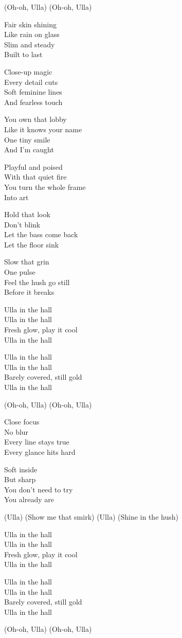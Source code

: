 \begin{lyrics}
(Oh-oh, Ulla)
(Oh-oh, Ulla)

Fair skin shining\\
Like rain on glass\\
Slim and steady\\
Built to last

Close-up magic\\
Every detail cuts\\
Soft feminine lines\\
And fearless touch

You own that lobby\\
Like it knows your name\\
One tiny smile\\
And I’m caught

Playful and poised\\
With that quiet fire\\
You turn the whole frame\\
Into art

Hold that look\\
Don’t blink\\
Let the bass come back\\
Let the floor sink

Slow that grin\\
One pulse\\
Feel the hush go still\\
Before it breaks

Ulla in the hall\\
Ulla in the hall\\
Fresh glow, play it cool\\
Ulla in the hall

Ulla in the hall\\
Ulla in the hall\\
Barely covered, still gold\\
Ulla in the hall

(Oh-oh, Ulla)
(Oh-oh, Ulla)

Close focus\\
No blur\\
Every line stays true\\
Every glance hits hard

Soft inside\\
But sharp\\
You don’t need to try\\
You already are

(Ulla)
(Show me that smirk)
(Ulla)
(Shine in the hush)

Ulla in the hall\\
Ulla in the hall\\
Fresh glow, play it cool\\
Ulla in the hall

Ulla in the hall\\
Ulla in the hall\\
Barely covered, still gold\\
Ulla in the hall

(Oh-oh, Ulla)
(Oh-oh, Ulla)
\end{lyrics}

